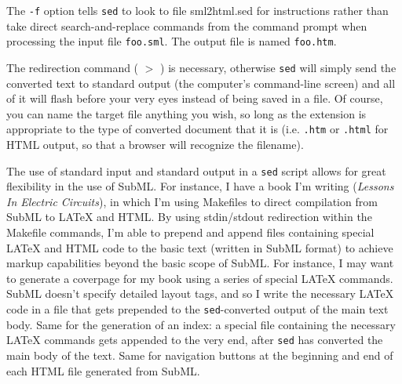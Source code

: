The {\tt -f} option tells {\tt sed} to look to file sml2html.sed for instructions rather than take direct search-and-replace commands from the command prompt when processing the input file {\tt foo.sml}.  The output file is named {\tt foo.htm}.
 

 

The redirection command ( $>$ ) is necessary, otherwise {\tt sed} will simply send the converted text to standard output (the computer's command-line screen) and all of it will flash before your very eyes instead of being saved in a file.  Of course, you can name the target file anything you wish, so long as the extension is appropriate to the type of converted document that it is (i.e. {\tt .htm} or {\tt .html} for HTML output, so that a browser will recognize the filename).
 

 

The use of standard input and standard output in a {\tt sed} script allows for great flexibility in the use of SubML.  For instance, I have a book I'm writing ({\it Lessons In Electric Circuits}), in which I'm using Makefiles to direct compilation from SubML to LA\TeX{} and HTML.  By using stdin/stdout redirection within the Makefile commands, I'm able to prepend and append files containing special LA\TeX{} and HTML code to the basic text (written in SubML format) to achieve markup capabilities beyond the basic scope of SubML.  For instance, I may want to generate a coverpage for my book using a series of special LA\TeX{} commands.  SubML doesn't specify detailed layout tags, and so I write the necessary LA\TeX{} code in a file that gets prepended to the {\tt sed}-converted output of the main text body.  Same for the generation of an index: a special file containing the necessary LA\TeX{} commands gets appended to the very end, after {\tt sed} has converted the main body of the text.  Same for navigation buttons at the beginning and end of each HTML file generated from SubML.
 



\bye 

